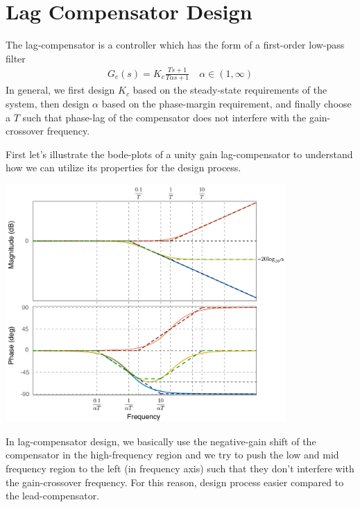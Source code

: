 \documentclass[twoside]{article}
\begin{document}
\newpage

\section{Lag Compensator Design}

The lag-compensator is a controller which has the form of a
first-order low-pass filter 
%
\begin{align*}
  G_{c}(s) = K_{c} \frac{T s + 1}{T \alpha s + 1}
  \quad \alpha \in (1,\infty)
\end{align*}
%
In general, we first design $K_{c}$ based on the steady-state
requirements of the system, then design $\alpha$
based on the phase-margin requirement, and finally 
choose a $T$ such that phase-lag of the compensator
does not interfere with the gain-crossover frequency.

First let's illustrate the bode-plots of a unity gain lag-compensator
to understand how we can utilize its properties for the 
design process. 

     \begin{center}
 \begin{minipage}[h]{\linewidth}
     \begin{center}
       \includegraphics[width=0.8\textwidth]{lag}
     \end{center}
 \end{minipage}
     \end{center}

In lag-compensator design, we basically use the negative-gain shift of
the compensator in the high-frequency region and we try to push the
low and mid frequency region to the left (in frequency axis) such that 
they don't interfere with the gain-crossover frequency. For this
reason, design process easier compared to the lead-compensator. 
\end{document}
